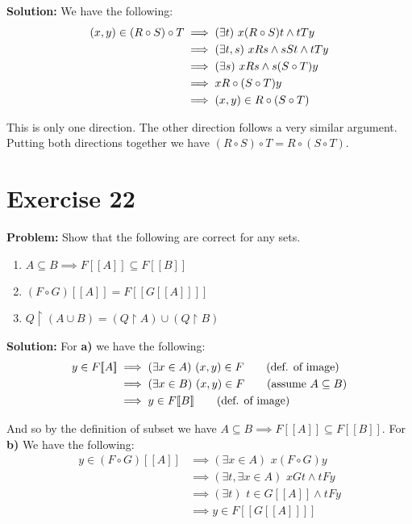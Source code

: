 \documentclass{article}
\begin{document}
\noindent\textbf{Solution:} We have the following:
\begin{align*}
    (x,y)\in(R\circ S)\circ T&\implies (\exists t)\,\, x(R\circ S)t\wedge tTy\\
    &\implies (\exists t,s)\,\, xRs\wedge sSt\wedge tTy\\
    &\implies (\exists s)\,\,xRs\wedge s(S\circ T)y\\
    &\implies xR\circ(S\circ T)y\\
    &\implies (x,y)\in R\circ(S\circ T)
\end{align*}

This is only one direction. The other direction follows a very similar argument. Putting both directions together we have $(R\circ S)\circ T=R\circ(S\circ T)$.

\section*{Exercise 22}
\noindent\textbf{Problem:} Show that the following are correct for any sets.
\begin{enumerate}[label=\alph*)]
    \item $A\subseteq B\implies F[\![A]\!]\subseteq F[\![B]\!]$
    \item $(F\circ G)[\![A]\!]=F[\![G[\![A]\!]]\!]$
    \item $Q\upharpoonright(A\cup B)=(Q\upharpoonright A)\cup(Q\upharpoonright B)$
\end{enumerate}
\bigskip

\noindent\textbf{Solution:} For \textbf{a)} we have the following:
\begin{align}
    y\in F[\![A]\!]&\implies (\exists x\in A)\,\,(x,y)\in F\tag{def. of image}\\
    &\implies (\exists x\in B)\,\,(x,y)\in F\tag{assume $A\subseteq B$}\\
    &\implies y\in F[\![B]\!]\tag{def. of image}
\end{align}

And so by the definition of subset we have $A\subseteq B\implies F[\![A]\!]\subseteq F[\![B]\!]$. For \textbf{b)} We have the following:
\begin{align*}
    y\in(F\circ G)[\![A]\!]&\implies(\exists x\in A)\,\,x(F\circ G)y\tag{def. of image}\\
    &\implies(\exists t,\exists x\in A)\,\,xGt\wedge tFy\tag{def. of composition}\\
    &\implies(\exists t)\,\,t\in G[\![A]\!]\wedge tFy\tag{def. of image}\\
    &\implies y\in F[\![G[\![A]\!]]\!]\tag{def. of image}\\
\end{align*}
\end{document}
